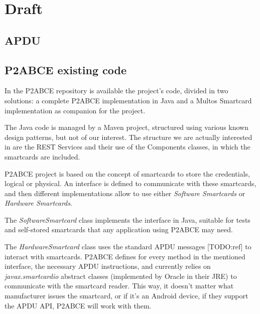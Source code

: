 \chapter{Draft}\label{ch:draft}


\section{APDU}


\section{P2ABCE existing code}


In the \ac{P2ABCE} repository \citep{p2abcurl} is available the project's code, divided in two solutions: a complete P2ABCE implementation in Java and a Multos Smartcard implementation as companion for the project.

The Java code is managed by a Maven project, structured using various known design patterns, but not of our interest. The structure we are actually interested in are the REST Services and their use of the Components classes, in which the smartcards are included.

P2ABCE project is based on the concept of smartcards to store the credentials, logical or physical. An interface is defined to communicate with these smartcards, and then different implementations allow to use either \textit{Software Smartcards} or \textit{Hardware Smartcards}. 

The \textit{SoftwareSmartcard} class implements the interface in Java, suitable for tests and self-stored smartcards that any application using P2ABCE may need.

The \textit{HardwareSmartcard} class uses the standard APDU messages [TODO:ref] to interact with smartcards. P2ABCE defines for every method in the mentioned interface, the necessary APDU instructions, and currently relies on \textit{javax.smartcardio} abstract classes (implemented by Oracle in their JRE) to communicate with the smartcard reader. This way, it doesn't matter what manufacturer issues the smartcard, or if it's an Android device, if they support the APDU API, P2ABCE will work with them.

